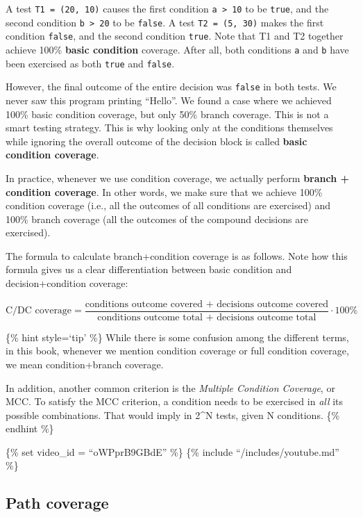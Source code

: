 A test \texttt{T1\ =\ (20,\ 10)} causes the first condition
\texttt{a\ \textgreater{}\ 10} to be \texttt{true}, and the second
condition \texttt{b\ \textgreater{}\ 20} to be \texttt{false}. A test
\texttt{T2\ =\ (5,\ 30)} makes the first condition \texttt{false}, and
the second condition \texttt{true}. Note that T1 and T2 together achieve
100\% \textbf{basic condition} coverage. After all, both conditions
\texttt{a} and \texttt{b} have been exercised as both \texttt{true} and
\texttt{false}.

However, the final outcome of the entire decision was \texttt{false} in
both tests. We never saw this program printing ``Hello''. We found a
case where we achieved 100\% basic condition coverage, but only 50\%
branch coverage. This is not a smart testing strategy. This is why
looking only at the conditions themselves while ignoring the overall
outcome of the decision block is called \textbf{basic condition
coverage}.

In practice, whenever we use condition coverage, we actually perform
\textbf{branch + condition coverage}. In other words, we make sure that
we achieve 100\% condition coverage (i.e., all the outcomes of all
conditions are exercised) and 100\% branch coverage (all the outcomes of
the compound decisions are exercised).

The formula to calculate branch+condition coverage is as follows. Note
how this formula gives us a clear differentiation between basic
condition and decision+condition coverage:

\[\text{C/DC coverage} = \frac{\text{conditions outcome covered + decisions outcome covered}}{\text{conditions outcome total + decisions outcome total}} \cdot 100\%\]

\{\% hint style=`tip' \%\} While there is some confusion among the
different terms, in this book, whenever we mention condition coverage or
full condition coverage, we mean condition+branch coverage.

In addition, another common criterion is the \emph{Multiple Condition
Coverage}, or MCC. To satisfy the MCC criterion, a condition needs to be
exercised in \emph{all} its possible combinations. That would imply in
2\^{}N tests, given N conditions. \{\% endhint \%\}

\{\% set video\_id = ``oWPprB9GBdE'' \%\} \{\% include
``/includes/youtube.md'' \%\}

\hypertarget{path-coverage}{%
\subsection{Path coverage}\label{path-coverage}}

